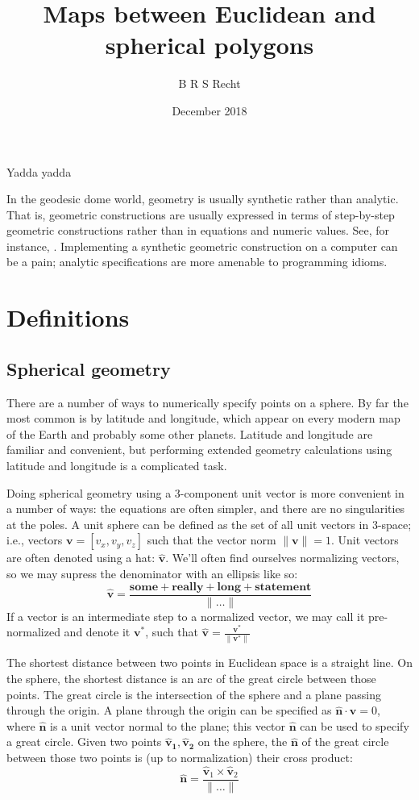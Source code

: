 \documentclass{amsart}[12pt]
\title{Maps between Euclidean and spherical polygons}
\author{B R S Recht}
\date{December 2018}
\begin{document}
\maketitle

Yadda yadda\cite{kahn}

In the geodesic dome world, geometry is usually synthetic rather than
analytic. That is, geometric constructions are usually expressed in terms of
step-by-step geometric constructions rather than in equations and numeric
values. See, for instance, \cite{kenner}. Implementing a synthetic geometric
construction on a computer can be a pain; analytic specifications are more
amenable to programming idioms.

\section{Definitions}

\subsection{Spherical geometry}
There are a number of ways to numerically specify points on a sphere. By far
the most common is by latitude and longitude, which appear on every modern map
of the Earth and probably some other planets. Latitude and longitude are
familiar and convenient, but performing extended geometry calculations using
latitude and longitude is a complicated task.

Doing spherical geometry using a 3-component unit vector is more convenient
in a number of ways: the equations are often simpler, and there are no
singularities at the poles. A unit sphere can be defined as the set of all unit
vectors in 3-space; i.e., vectors $\mathbf v = [v_x, v_y, v_z]$ such that the
vector norm $\|\mathbf v \|=1$. Unit vectors are often denoted using a hat:
$\hat{\mathbf v}$. We'll often find ourselves normalizing vectors,
so we may supress the denominator with an ellipsis like so:
\begin{equation}
  \hat{\mathbf v} = \frac{\mathbf{some+really+long+statement}}{\|\dots\|}
\end{equation}
If a vector is an intermediate step to a normalized vector,
we may call it pre-normalized and denote it ${\mathbf v}^*$,
such that $\hat{\mathbf v} = \frac{{\mathbf v}^*}{ \|{\mathbf v}^*\|}$

The shortest distance between two points in Euclidean space is a straight line.
On the sphere, the shortest distance is an arc of the great circle between those
points. The great circle is the intersection of the sphere and a plane passing
through the origin. A plane through the origin can be specified as
$\hat{\mathbf n} \cdot \mathbf v = 0$, where $\hat{\mathbf n}$ is a unit vector
normal to the plane; this vector $\hat{\mathbf n}$ can be used to specify a
great circle. Given two points $\mathbf{\hat{v}_1, \hat{v}_2}$ on the sphere,
the $\hat{\mathbf n}$ of the great circle between those two points is (up to
normalization) their cross product:
\begin{equation}
  \mathbf{\hat{n}} =
\frac{\mathbf{\hat{v}}_1 \times \mathbf{\hat{v}}_2}{\|\dots\|}
\end{equation}
\end{document}
